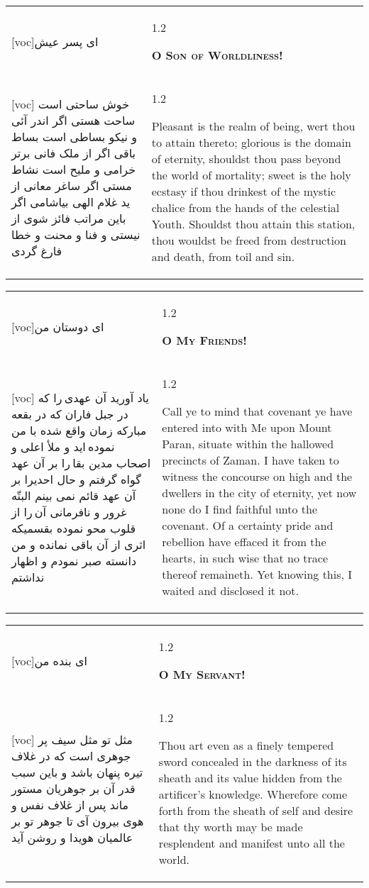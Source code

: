 \documentclass[11pt]{article}
\makeatletter
\newenvironment{orig}
  {\begin{farsi}[voc]}
  {\end{farsi}}
\newenvironment{trans}
  {\Large\begin{spacing}{1.2}\raggedright}
  {\end{spacing}}
\newenvironment{word}
  {\begin{tabular}[t]{p{2.75in}@{\hspace{3em}}p{2.75in}}}
  {\end{tabular}}
\newcommand{\ayat}[2]{\begin{orig}#1\end{orig} & \begin{trans}#2\end{trans}}
\newcommand{\heading}[2]{\textsc{\textbf{#1}} %
}
\makeatother
\begin{document}
\pagebreak

\begin{word}
\ayat{ای پسر عيش}{\heading{O Son of Worldliness!}{}} \\ \ayat{
خوش ساحتی است ساحت هستی اگر اندر آئی و نيکو بساطی است بساط باقی اگر از ملک فانی برتر خرامی و مليح است نشاط مستی اگر ساغر معانی از يد غلام الهی بياشامی اگر باين مراتب فائز شوی از نيستی و فنا و محنت و خطا فارغ گردی
}{
  Pleasant is the realm of being, wert thou to attain thereto; glorious is the
  domain of eternity, shouldst thou pass beyond the world of mortality; sweet
  is the holy ecstasy if thou drinkest of the mystic chalice from the hands of
  the celestial Youth. Shouldst thou attain this station, thou wouldst be
  freed from destruction and death, from toil and sin.
}
\end{word}

\pagebreak

\begin{word}
\ayat{ای دوستان من}{\heading{O My Friends!}{}} \\ \ayat{
ياد آوريد آن عهدی را که در جبل فاران که در بقعه مبارکه زمان واقع شده با من نموده ايد و ملأ اعلی و اصحاب مدين بقا را بر آن عهد گواه گرفتم و حال احديرا بر آن عهد قائم نمی بينم البتّه غرور و نافرمانی آن را از قلوب محو نموده بقسميکه اثری از آن باقی نمانده و من دانسته صبر نمودم و اظهار نداشتم
}{
  Call ye to mind that covenant ye have entered into with Me upon Mount Paran,
  situate within the hallowed precincts of Zaman. I have taken to witness the
  concourse on high and the dwellers in the city of eternity, yet now none do
  I find faithful unto the covenant. Of a certainty pride and rebellion have
  effaced it from the hearts, in such wise that no trace thereof remaineth.
  Yet knowing this, I waited and disclosed it not.
}
\end{word}

\pagebreak

\begin{word}
\ayat{ای بنده من}{\heading{O My Servant!}{}} \\ \ayat{
مثل تو مثل سيف پر جوهری است که در غلاف تيره پنهان باشد و باين سبب قدر آن بر جوهريان مستور ماند
پس از غلاف نفس و هوی بيرون آی تا جوهر تو بر عالميان هويدا و روشن آيد
}{
  Thou art even as a finely tempered sword concealed in the darkness of its
  sheath and its value hidden from the artificer's knowledge. Wherefore come
  forth from the sheath of self and desire that thy worth may be made
  resplendent and manifest unto all the world.
}
\end{word}
\end{document}
